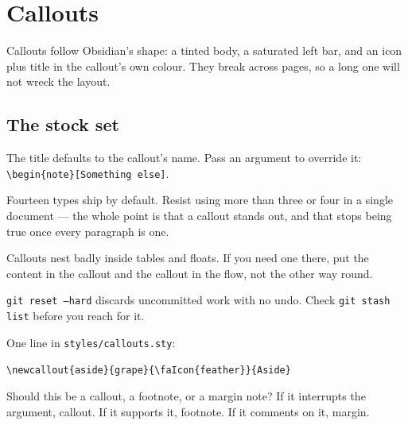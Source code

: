 \chapter{Callouts}

Callouts follow Obsidian's shape: a tinted body, a saturated left bar, and an
icon plus title in the callout's own colour. They break across pages, so a
long one will not wreck the layout.

\section{The stock set}

\begin{note}
The title defaults to the callout's name. Pass an argument to override it:
\texttt{\textbackslash begin\{note\}[Something else]}.
\end{note}

\begin{tip}
Fourteen types ship by default. Resist using more than three or four in a
single document — the whole point is that a callout stands out, and that
stops being true once every paragraph is one.
\end{tip}

\begin{warning}
Callouts nest badly inside tables and floats. If you need one there, put the
content in the callout and the callout in the flow, not the other way round.
\end{warning}

\begin{caution}
\texttt{git reset --hard} discards uncommitted work with no undo. Check
\texttt{git stash list} before you reach for it.
\end{caution}

\begin{example}
One line in \texttt{styles/callouts.sty}:

\vspace{4pt}
\texttt{\textbackslash newcallout\{aside\}\{grape\}\{\textbackslash faIcon\{feather\}\}\{Aside\}}
\end{example}

\begin{question}
Should this be a callout, a footnote, or a margin note? If it interrupts the
argument, callout. If it supports it, footnote. If it comments on it, margin.
\end{question}

